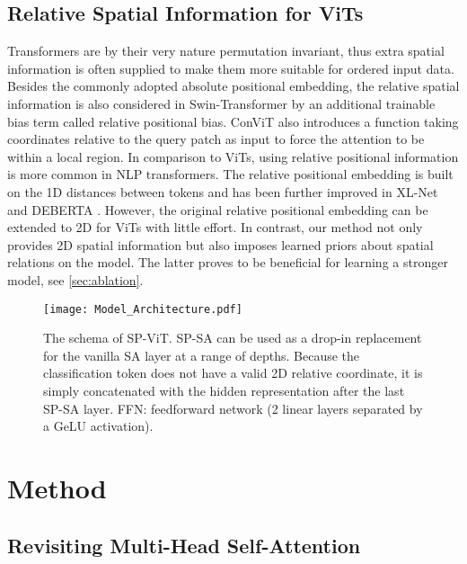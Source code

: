 \documentclass[authorversion, sigconf, acmthm=false, nonacm=true]{acmart}
\begin{document}
\subsection{Relative Spatial Information for ViTs}
Transformers are by their very nature permutation invariant, thus extra spatial information is often supplied to make them more suitable for ordered input data. 
Besides the commonly adopted absolute positional embedding, the relative spatial information
is also considered in Swin-Transformer \cite{liu2021swin} by an additional trainable
bias term called relative positional bias. ConViT \cite{d'ascoli2021convit} also
introduces a function taking coordinates relative to the query patch as input to force the attention to be within a local region.  
In comparison to ViTs, using relative positional information is more common in NLP transformers.
The relative positional embedding \cite{shaw2018self} is built on the 1D distances between tokens and has been further improved in XL-Net \cite{yang2019xlnet} and DEBERTA \cite{he2021deberta}.
However, the original relative positional embedding can be extended to 2D for ViTs with little effort. 
In contrast, our method not only provides 2D spatial information but also imposes learned priors about spatial relations on the model. The latter proves to be beneficial for learning a stronger model, see \cref{sec:ablation}.

\begin{figure*}[ht]
  \centering
  \texttt{[image: Model\_Architecture.pdf]} \caption{The schema of SP-ViT. SP-SA can be used as a drop-in replacement for the vanilla SA layer at a range of depths.
  Because the classification token does not have a valid 2D relative coordinate, it is simply concatenated with the hidden representation after the last SP-SA layer.
  FFN: feedforward network (2 linear layers separated by a GeLU activation).
  }

  \label{fig2}
  \end{figure*}
  



\section{Method}
\label{sec:method}

\subsection{Revisiting Multi-Head Self-Attention}
\end{document}
